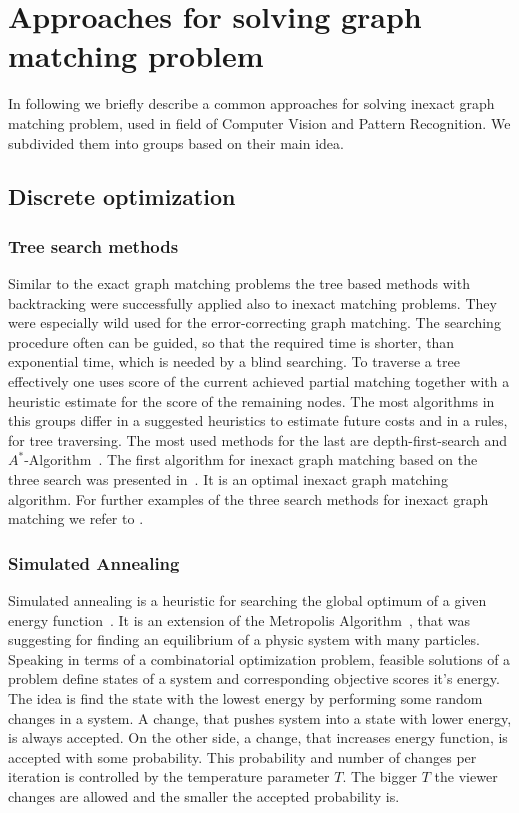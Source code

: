 \section{Approaches for solving graph matching problem}
In following we briefly describe a common approaches for solving inexact graph matching problem, used in field of Computer Vision and Pattern Recognition. We subdivided them into groups based on their main idea.

\subsection{Discrete optimization}
\subsubsection{Tree search methods}
Similar to the exact graph matching problems the tree based methods with backtracking were successfully applied also to inexact matching problems. They were especially wild used for the error-correcting graph matching. The searching procedure often can be guided, so that the required time is shorter, than exponential time, which is needed by a blind searching. To traverse a tree effectively one uses score of the current achieved partial matching together with a heuristic estimate for the score of the remaining nodes. The most algorithms in this groups differ in a suggested heuristics to estimate future costs and in a rules, for tree traversing. The most used methods for the last are depth-first-search and $A^*$-Algorithm~\cite{AStar}.
The first algorithm for inexact graph matching based on the three search was presented in~\cite{Fu1979}. It is an optimal inexact graph matching algorithm. For further examples of the three search methods for inexact graph matching we refer to \cite{Bunke1983_inexactGM,Shapiro1981,Wang1995}.
\subsubsection{Simulated Annealing}
Simulated annealing is a heuristic for searching the global optimum of a given energy function~\cite{Burkard98thequadratic}. It is an extension of the Metropolis Algorithm~\cite{Metropolis}, that was suggesting for finding an equilibrium of a physic system with many particles. Speaking in terms of a combinatorial optimization problem, feasible solutions of a problem define states of a system and corresponding objective scores it's energy. The idea is find the state with the lowest energy by performing some random changes in a system. A change, that pushes system into a state with lower energy, is always accepted. On the other side, a change, that increases energy function, is accepted with some probability. This probability and number of changes per iteration is controlled by the temperature parameter $T$. The bigger $T$ the viewer changes are allowed and the smaller the accepted probability is. 

